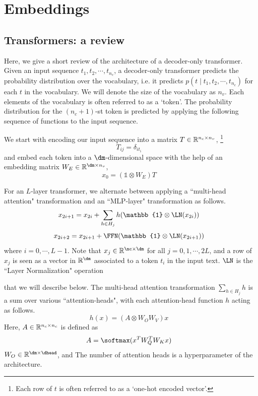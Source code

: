 
\section{Embeddings}

\subsection{Transformers: a review}

Here, we give a short review of the architecture of a decoder-only transformer. Given an input sequence $t_1, t_2, \cdots, t_{n_c}$, a decoder-only transformer predicts the probability distribution over the vocabulary, i.e. it predicts $p(t \mid t_1, t_2, \cdots, t_{n_c})$ for each $t$ in the vocabulary. We will denote the size of the vocabulary as $n_v$. Each elements of the vocabulary is often referred to as a `token'. The probability distribution for the $(n_c+1)$-st token is predicted by applying the following sequence of functions to the input sequence.

We start with encoding our input sequence into a matrix $T \in \mathbb{R}^{n_c \times n_v}$,
\footnote{Each row of $t$ is often referred to as a `one-hot encoded vector'.}
\[
T_{ij} = \delta_{i t_i}
\]
and embed each token into a $\dm$-dimensional space with the help of an embedding matrix $W_E \in \R^{\dm \times n_v}$,
\[
x_0 = (\mathbb{1} \otimes W_E) T
\]

For an $L$-layer transformer, we alternate between applying a ``multi-head attention" transformation and an ``MLP-layer" transformation as follows. 
\[
x_{2i+1} = x_{2i} + \sum_{h \in H_j} h(\mathbb{1} \otimes \LN(x_{2i})) 
\]
\[
x_{2i + 2} = x_{2i + 1} + \FFN(\mathbb{1} \otimes \LN(x_{2i + 1}))
\]
where $i=0, \cdots, L-1$. Note that $x_j \in \R^{\nc \times \dm}$ for all $j = 0, 1, \cdots, 2L$, and a row of $x_j$ is seen as a vector in $\R^{\dm}$ associated to a token $t_i$ in the input text. $\LN$ is the ``Layer Normalization" operation  


that we will describe below. The multi-head attention transformation $\sum_{h \in H_j} h$ is a sum over various ``attention-heads", with each attention-head function $h$ acting as follows.
\[
h(x) = (A \otimes W_O W_V) x
\]
Here, $A \in \mathbb{R}^{n_c \times n_c}$ is defined as
\[
A = \softmax(x^T W_Q^T W_K x)
\] 
$W_O \in \R^{\dm \times \dhead}$, and 
The number of attention heads is a hyperparameter of the architecture.

